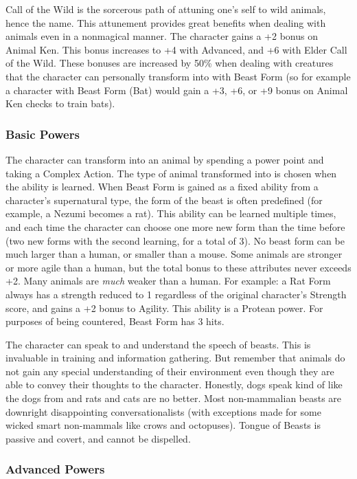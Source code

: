 Call of the Wild is the sorcerous path of attuning one's self to wild animals, hence the name. This attunement provides great benefits when dealing with animals even in a nonmagical manner. The character gains a +2 bonus on Animal Ken. This bonus increases to +4 with Advanced, and +6 with Elder Call of the Wild. These bonuses are increased by 50\% when dealing with creatures that the character can personally transform into with Beast Form (so for example a character with Beast Form (Bat) would gain a +3, +6, or +9 bonus on Animal Ken checks to train bats).

\subsubsection{Basic Powers}

 The character can transform into an animal by spending a power point and taking a Complex Action.  The type of animal transformed into is chosen when the ability is learned. When Beast Form is gained as a fixed ability from a character's supernatural type, the form of the beast is often predefined (for example, a Nezumi becomes a rat). This ability can be learned multiple times, and each time the character can choose one more new form than the time before (two new forms with the second learning, for a total of 3). No beast form can be much larger than a human, or smaller than a mouse. Some animals are stronger or more agile than a human, but the total bonus to these attributes never exceeds +2. Many animals are \textit{much} weaker than a human. For example: a Rat Form always has a strength reduced to 1 regardless of the original character's Strength score, and gains a +2 bonus to Agility. This ability is a Protean power. For purposes of being countered, Beast Form has 3 hits.

 The character can speak to and understand the speech of beasts. This is invaluable in training and information gathering. But remember that animals do not gain any special understanding of their environment even though they are able to convey their thoughts to the character. Honestly, dogs speak kind of like the dogs from  and rats and cats are no better. Most non-mammalian beasts are downright disappointing conversationalists (with exceptions made for some wicked smart non-mammals like crows and octopuses). Tongue of Beasts is passive and covert, and cannot be dispelled.

\subsubsection{Advanced Powers}

